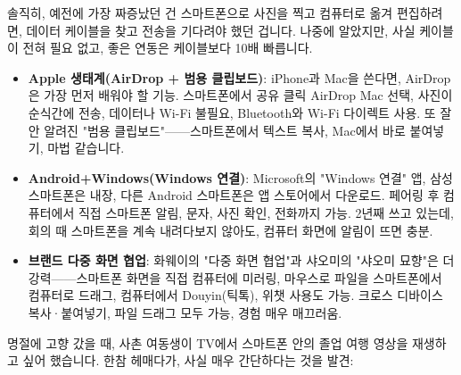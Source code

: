 


솔직히, 예전에 가장 짜증났던 건 스마트폰으로 사진을 찍고 컴퓨터로 옮겨 편집하려면, 데이터 케이블을 찾고 전송을 기다려야 했던 겁니다. 나중에 알았지만, 사실 케이블이 전혀 필요 없고, 좋은 연동은 케이블보다 10배 빠릅니다.

\begin{itemize}
  \item \textbf{Apple 생태계(AirDrop + 범용 클립보드)}: iPhone과 Mac을 쓴다면, AirDrop은 가장 먼저 배워야 할 기능. 스마트폰에서 공유 클릭 AirDrop Mac 선택, 사진이 순식간에 전송, 데이터나 Wi-Fi 불필요, Bluetooth와 Wi-Fi 다이렉트 사용. 또 잘 안 알려진 "범용 클립보드"——스마트폰에서 텍스트 복사, Mac에서 바로 붙여넣기, 마법 같습니다.
  \item \textbf{Android+Windows(Windows 연결)}: Microsoft의 "Windows 연결" 앱, 삼성 스마트폰은 내장, 다른 Android 스마트폰은 앱 스토어에서 다운로드. 페어링 후 컴퓨터에서 직접 스마트폰 알림, 문자, 사진 확인, 전화까지 가능. 2년째 쓰고 있는데, 회의 때 스마트폰을 계속 내려다보지 않아도, 컴퓨터 화면에 알림이 뜨면 충분.
  \item \textbf{브랜드 다중 화면 협업}: 화웨이의 "다중 화면 협업"과 샤오미의 "샤오미 묘향"은 더 강력——스마트폰 화면을 직접 컴퓨터에 미러링, 마우스로 파일을 스마트폰에서 컴퓨터로 드래그, 컴퓨터에서 Douyin(틱톡), 위챗 사용도 가능. 크로스 디바이스 복사·붙여넣기, 파일 드래그 모두 가능, 경험 매우 매끄러움.
\end{itemize}


명절에 고향 갔을 때, 사촌 여동생이 TV에서 스마트폰 안의 졸업 여행 영상을 재생하고 싶어 했습니다. 한참 헤매다가, 사실 매우 간단하다는 것을 발견:

